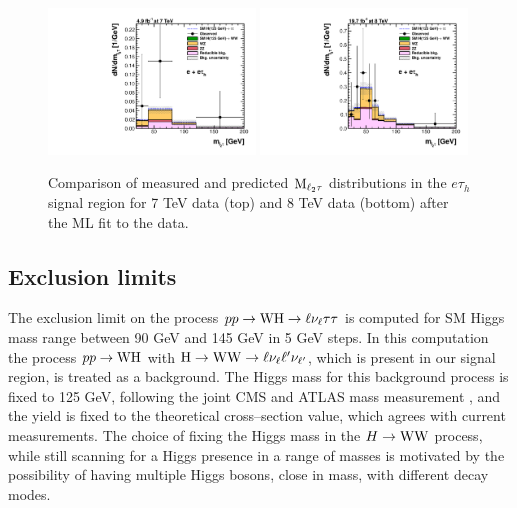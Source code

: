 \begin{figure}
\begin{center}
  \includegraphics[width=0.49\textwidth]{4_Analisys/pics/postfit/eet_postfit_7TeV_FitAllChannels.pdf}
  \includegraphics[width=0.49\textwidth]{4_Analisys/pics/postfit/eet_postfit_8TeV_FitAllChannels.pdf}\\
  \caption{Comparison of measured and predicted $\rm{M}_{\ell_2\tau}$ distributions in the $e\tau_h$ signal region for 7 TeV data (top) and 8 TeV data (bottom) after the ML fit to the data.}
  \label{fig:LLT_eet_postfit}
\end{center}
\end{figure}

\subsection{Exclusion limits}

The exclusion limit on the process $pp\To\W\rm{H}\To\ell\nu_\ell\tau\tau$ is computed for SM Higgs mass range between 90 GeV and 145 GeV in 5 GeV steps. In this computation the process $pp\To\W\H$ with $\H\To\W\W\To\ell\nu_{\ell}\ell'\nu_{\ell'}$, which is present in our signal region, is treated as a background. The Higgs mass for this background process is fixed to 125 GeV, following the joint CMS and ATLAS mass measurement \cite{CMS:2014ega, Aad:2014aba}, and the yield is fixed to the theoretical cross--section value, which agrees with current measurements. The choice of fixing the Higgs mass in the $H\To\W\W$ process, while still scanning for a Higgs presence in a range of masses is motivated by the possibility of having multiple Higgs bosons, close in mass, with different decay modes.

